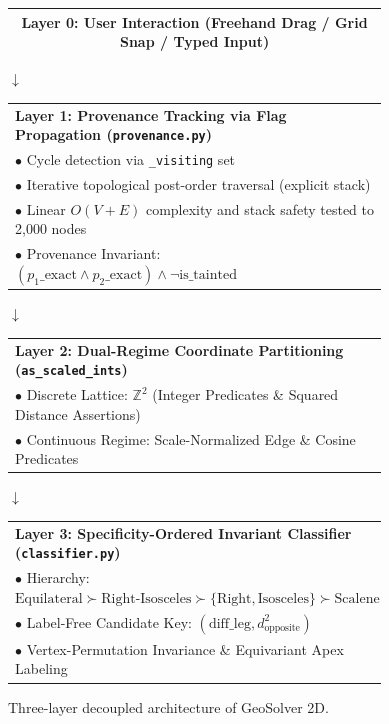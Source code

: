 \documentclass[preprint,12pt]{elsarticle}
\begin{document}
\begin{figure}[!htbp]
\centering
\small
\begin{tabular}{|p{0.88\linewidth}|}
\hline
\multicolumn{1}{|c|}{\textbf{Layer 0: User Interaction} (Freehand Drag / Grid Snap / Typed Input)} \\
\hline
\end{tabular}

\vspace{2pt}
$\downarrow$
\vspace{2pt}

\begin{tabular}{|p{0.88\linewidth}|}
\hline
\textbf{Layer 1: Provenance Tracking via Flag Propagation (\texttt{provenance.py})} \\
$\bullet$ Cycle detection via \texttt{\_visiting} set \\
$\bullet$ Iterative topological post-order traversal (explicit stack) \\
$\bullet$ Linear $O(V+E)$ complexity and stack safety tested to 2,000 nodes \\
$\bullet$ Provenance Invariant: $(p_1\text{\_exact} \land p_2\text{\_exact}) \land \neg \text{is\_tainted}$ \\
\hline
\end{tabular}

\vspace{2pt}
$\downarrow$
\vspace{2pt}

\begin{tabular}{|p{0.88\linewidth}|}
\hline
\textbf{Layer 2: Dual-Regime Coordinate Partitioning (\texttt{as\_scaled\_ints})} \\
$\bullet$ Discrete Lattice: $\mathbb{Z}^2$ (Integer Predicates \& Squared Distance Assertions) \\
$\bullet$ Continuous Regime: Scale-Normalized Edge \& Cosine Predicates \\
\hline
\end{tabular}

\vspace{2pt}
$\downarrow$
\vspace{2pt}

\begin{tabular}{|p{0.88\linewidth}|}
\hline
\textbf{Layer 3: Specificity-Ordered Invariant Classifier (\texttt{classifier.py})} \\
$\bullet$ Hierarchy: $\text{Equilateral} \succ \text{Right-Isosceles} \succ \{\text{Right}, \text{Isosceles}\} \succ \text{Scalene}$ \\
$\bullet$ Label-Free Candidate Key: $(\text{diff\_leg}, d^2_{\text{opposite}})$ \\
$\bullet$ Vertex-Permutation Invariance \& Equivariant Apex Labeling \\
\hline
\end{tabular}
\caption{Three-layer decoupled architecture of GeoSolver 2D.}
\label{fig:architecture}
\end{figure}
\end{document}
